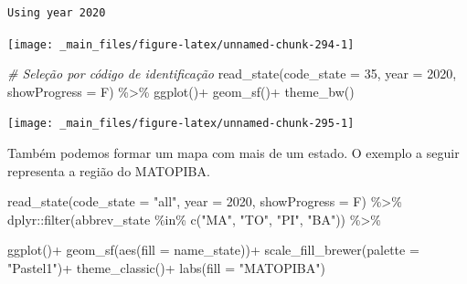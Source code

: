 \documentclass[
  brazilian,
]{book}
\newenvironment{Shaded}{\begin{snugshade}}{\end{snugshade}}
\newcommand{\AttributeTok}[1]{\textcolor[rgb]{0.77,0.63,0.00}{#1}}
\newcommand{\CommentTok}[1]{\textcolor[rgb]{0.56,0.35,0.01}{\textit{#1}}}
\newcommand{\DecValTok}[1]{\textcolor[rgb]{0.00,0.00,0.81}{#1}}
\newcommand{\FunctionTok}[1]{\textcolor[rgb]{0.00,0.00,0.00}{#1}}
\newcommand{\NormalTok}[1]{#1}
\newcommand{\SpecialCharTok}[1]{\textcolor[rgb]{0.00,0.00,0.00}{#1}}
\newcommand{\StringTok}[1]{\textcolor[rgb]{0.31,0.60,0.02}{#1}}
\begin{document}
\begin{verbatim}
Using year 2020
\end{verbatim}

\begin{center}\texttt{[image: \_main\_files/figure-latex/unnamed-chunk-294-1]} \end{center}

\begin{Shaded}
\begin{Highlighting}[]
\CommentTok{\# Seleção por código de identificação}
\FunctionTok{read\_state}\NormalTok{(}\AttributeTok{code\_state =} \DecValTok{35}\NormalTok{,}
           \AttributeTok{year =} \DecValTok{2020}\NormalTok{,}
           \AttributeTok{showProgress =}\NormalTok{ F) }\SpecialCharTok{\%\textgreater{}\%} 
  \FunctionTok{ggplot}\NormalTok{()}\SpecialCharTok{+}
  \FunctionTok{geom\_sf}\NormalTok{()}\SpecialCharTok{+}
  \FunctionTok{theme\_bw}\NormalTok{()}
\end{Highlighting}
\end{Shaded}

\begin{center}\texttt{[image: \_main\_files/figure-latex/unnamed-chunk-295-1]} \end{center}

Também podemos formar um mapa com mais de um estado. O exemplo a seguir representa a região do MATOPIBA.

\begin{Shaded}
\begin{Highlighting}[]
\FunctionTok{read\_state}\NormalTok{(}\AttributeTok{code\_state =} \StringTok{"all"}\NormalTok{,}
           \AttributeTok{year =} \DecValTok{2020}\NormalTok{,}
           \AttributeTok{showProgress =}\NormalTok{ F) }\SpecialCharTok{\%\textgreater{}\%} 
\NormalTok{  dplyr}\SpecialCharTok{::}\FunctionTok{filter}\NormalTok{(abbrev\_state }\SpecialCharTok{\%in\%} \FunctionTok{c}\NormalTok{(}\StringTok{"MA"}\NormalTok{, }\StringTok{"TO"}\NormalTok{, }\StringTok{"PI"}\NormalTok{, }\StringTok{"BA"}\NormalTok{)) }\SpecialCharTok{\%\textgreater{}\%} 
  
  \FunctionTok{ggplot}\NormalTok{()}\SpecialCharTok{+}
  \FunctionTok{geom\_sf}\NormalTok{(}\FunctionTok{aes}\NormalTok{(}\AttributeTok{fill =}\NormalTok{ name\_state))}\SpecialCharTok{+}
  \FunctionTok{scale\_fill\_brewer}\NormalTok{(}\AttributeTok{palette =} \StringTok{"Pastel1"}\NormalTok{)}\SpecialCharTok{+}
  \FunctionTok{theme\_classic}\NormalTok{()}\SpecialCharTok{+}
  \FunctionTok{labs}\NormalTok{(}\AttributeTok{fill =} \StringTok{"MATOPIBA"}\NormalTok{)}
\end{Highlighting}
\end{Shaded}
\end{document}
